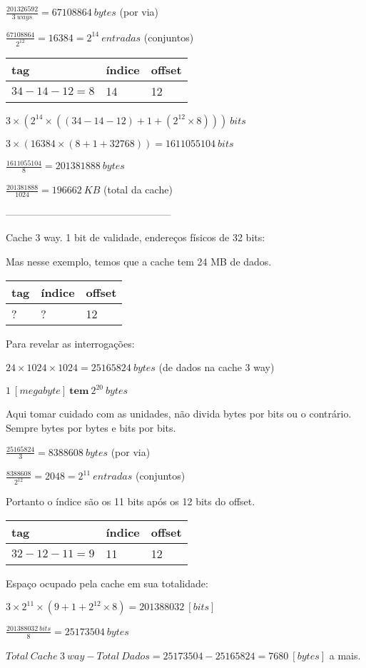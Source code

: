 \documentclass[11pt,twocolumn]{article}
\begin{document}
$\frac{201326592}{3\ ways} = 67108864\ bytes$ (por via)

$\frac{67108864}{2^{12}} = 16384 = 2^{14}\ entradas$ (conjuntos)

\begin{tabular}{|l|l|l|}
\hline tag & índice & offset \\ 
\hline $34-14-12=8$ & 14 & 12 \\ 
\hline 
\end{tabular}


$3\times(2^{14}\times((34-14-12)+1+(2^{12}\times8)))\ bits$

$3\times(16384\times(8+1+32768)) = 1611055104\ bits$

$\frac{1611055104}{8} = 201381888\ bytes$

$\frac{201381888}{1024} = 196662\ KB$ (total da cache)


--------------------------------------------------

\clearpage

Cache 3 way. 1 bit de validade, endereços físicos de 32 bits:

Mas nesse exemplo, temos que a cache tem 24 MB de dados.

\begin{tabular}{|l|l|l|}
\hline tag & índice & offset \\ 
\hline ? & ? & 12 \\ 
\hline 
\end{tabular}

Para revelar as interrogações:

$24 \times 1024 \times 1024 = 25165824\ bytes$ (de dados na cache 3 way)

$1\ [megabyte]\ \textbf{tem}\ 2^{20}\ bytes$

Aqui tomar cuidado com as unidades, não
divida bytes por bits ou o contrário.
Sempre bytes por bytes e bits por bits.

$\frac{25165824}{3} = 8388608\ bytes$ (por via)

$\frac{8388608}{2^{12}} = 2048 = 2^{11}\ entradas$ (conjuntos)

Portanto o índice são os 11 bits após os 12 bits do offset.

\begin{tabular}{|l|l|l|}
\hline tag & índice & offset \\
\hline $32-12-11=9$ & 11 & 12 \\
\hline
\end{tabular}

Espaço ocupado pela cache em sua totalidade:

$3 \times 2^{11} \times (9 + 1 + 2^{12} \times 8) = 201388032\ [bits]$

$\frac{201388032\ bits}{8} = 25173504\ bytes$

${Total\ Cache\ 3\ way} - {Total\ Dados} = {25173504} - {25165824} = 7680\ 
[bytes]$ a mais.
\end{document}
